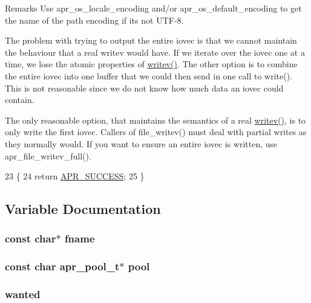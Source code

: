 \begin{DoxyRemark}{Remarks}
Use {\ttfamily apr\+\_\+os\+\_\+locale\+\_\+encoding} and/or {\ttfamily apr\+\_\+os\+\_\+default\+\_\+encoding} to get the name of the path encoding if it\textquotesingle{}s not U\+T\+F-\/8. 
\end{DoxyRemark}
The problem with trying to output the entire iovec is that we cannot maintain the behaviour that a real writev would have. If we iterate over the iovec one at a time, we lose the atomic properties of \hyperlink{apr__arch__os2calls_8h_a3d0f3996136a9b5ab46431c60c746efd}{writev()}. The other option is to combine the entire iovec into one buffer that we could then send in one call to write(). This is not reasonable since we do not know how much data an iovec could contain.

The only reasonable option, that maintains the semantics of a real \hyperlink{apr__arch__os2calls_8h_a3d0f3996136a9b5ab46431c60c746efd}{writev()}, is to only write the first iovec. Callers of file\+\_\+writev() must deal with partial writes as they normally would. If you want to ensure an entire iovec is written, use apr\+\_\+file\+\_\+writev\+\_\+full().
\begin{DoxyCode}
23 \{
24     \textcolor{keywordflow}{return} \hyperlink{group__apr__errno_ga9ee311b7bf1c691dc521d721339ee2a6}{APR\_SUCCESS};
25 \}
\end{DoxyCode}


\subsection{Variable Documentation}
\subsubsection[{\texorpdfstring{fname}{fname}}]{\setlength{\rightskip}{0pt plus 5cm}const char$\ast$ fname}\hypertarget{group__apr__file__stat_ga6a2fc0c236288b07ce5bd1335ca89fa2}{}\label{group__apr__file__stat_ga6a2fc0c236288b07ce5bd1335ca89fa2}
\subsubsection[{\texorpdfstring{pool}{pool}}]{\setlength{\rightskip}{0pt plus 5cm}const char {\bf apr\+\_\+pool\+\_\+t}$\ast$ pool}\hypertarget{group__apr__file__stat_ga51fbc0d90e2519e2e42e03c5dd9f441b}{}\label{group__apr__file__stat_ga51fbc0d90e2519e2e42e03c5dd9f441b}
\subsubsection[{\texorpdfstring{wanted}{wanted}}]{ wanted}\hypertarget{group__apr__file__stat_ga48805d2a6845252444835c7809c73ade}{}\label{group__apr__file__stat_ga48805d2a6845252444835c7809c73ade}
